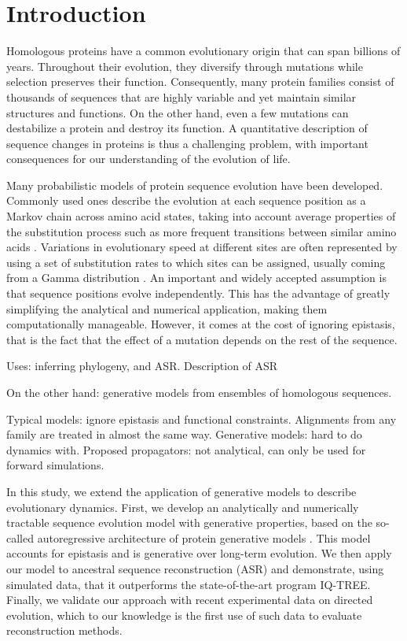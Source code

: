 
\section{Introduction}

Homologous proteins have a common evolutionary origin that can span billions of years. 
Throughout their evolution, they diversify through mutations while selection preserves their function. 
Consequently, many protein families consist of thousands of sequences that are highly variable and yet maintain similar structures and functions. 
On the other hand, even a few mutations can destabilize a protein and destroy its function. 
A quantitative description of sequence changes in proteins is thus a challenging problem, with important consequences for our understanding of the evolution of life. 

Many probabilistic models of protein sequence evolution have been developed. 
Commonly used ones describe the evolution at each sequence position as a Markov chain across amino acid states, taking into account average properties of the substitution process such as more frequent transitions between similar amino acids \cite{dayhoff_modelevolutionarychange_1978,henikoff_aminoacidsubstitution_1992,jones_rapidgenerationmutation_1992}. 
Variations in evolutionary speed at different sites are often represented by using a set of substitution rates to which sites can be assigned, usually coming from a Gamma distribution \cite{yang_maximumlikelihoodphylogenetic_1994}.
An important and widely accepted assumption is that sequence positions evolve independently. 
This has the advantage of greatly simplifying the analytical and numerical application, making them computationally manageable. 
However, it comes at the cost of ignoring epistasis, that is the fact that the effect of a mutation depends on the rest of the sequence. 

Uses: inferring phylogeny, and ASR. Description of ASR

On the other hand: generative models from ensembles of homologous sequences. 

Typical models: ignore epistasis and functional constraints. Alignments from any family are treated in almost the same way. 
Generative models: hard to do dynamics with. Proposed propagators: not analytical, can only be used for forward simulations. 

In this study, we extend the application of generative models to describe evolutionary dynamics. 
First, we develop an analytically and numerically tractable sequence evolution model with generative properties, based on the so-called autoregressive architecture of protein generative models \cite{trinquier_efficientgenerativemodeling_2021}. 
This model accounts for epistasis and is generative over long-term evolution. 
We then apply our model to ancestral sequence reconstruction (ASR) and demonstrate, using simulated data, that it outperforms the state-of-the-art program IQ-TREE. 
Finally, we validate our approach with recent experimental data on directed evolution, which to our knowledge is the first use of such data to evaluate reconstruction methods.


